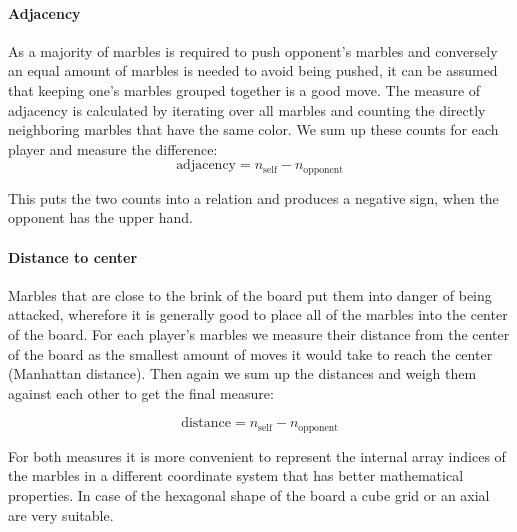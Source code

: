 \documentclass{llncs}
\begin{document}
\paragraph{Adjacency}
As a majority of marbles is required to push opponent's marbles and conversely an equal amount of marbles is needed to avoid being pushed, it can be assumed that keeping one's marbles grouped together is a good move. The measure of adjacency is calculated by iterating over all marbles and counting the directly neighboring marbles that have the same color. We sum up these counts for each player and measure the difference:
$$ \text{adjacency} = n_{\text{self}} - n_{\text{opponent}} $$

This puts the two counts into a relation and produces a negative sign, when the opponent has the upper hand.


\paragraph{Distance to center}
Marbles that are close to the brink of the board put them into danger of being attacked, wherefore it is generally good to place all of the marbles into the center of the board. For each player's marbles we measure their distance from the center of the board as the smallest amount of moves it would take to reach the center (Manhattan distance). Then again we sum up the distances and weigh them against each other to get the final measure:

$$ \text{distance} = n_{\text{self}} - n_{\text{opponent}} $$

For both measures it is more convenient to represent the internal array indices of the marbles in a different coordinate system that has better mathematical properties. In case of the hexagonal shape of the board a cube grid or an axial are very suitable.
\end{document}
